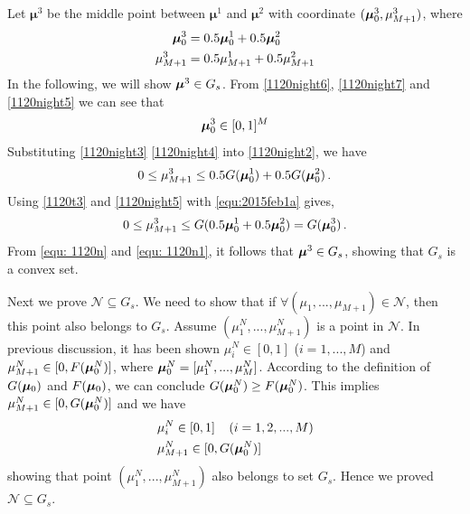 Let $\boldsymbol{\mu}^3$ be the middle point between $\boldsymbol{\mu}^1$ and $\boldsymbol{\mu}^2$ with coordinate $(\boldsymbol{\mu}_0^3, \mu_{M+1}^3)$, where  
\begin{subequations}
\label{1120t5}
\begin{align}
\label{1120night5}
\boldsymbol{\mu}_0^3 &= 0.5\boldsymbol{\mu}_0^1 + 0.5 \boldsymbol{\mu}_0^2\\
\label{1120night2}
\mu_{M+1}^3 &= 0.5 \mu_{M+1}^1 + 0.5 \mu_{M+1}^2
\end{align}
\end{subequations}
In the following, we will show $\boldsymbol{\mu}^3 \in G_s$.  
From \eqref{1120night6}, \eqref{1120night7} and \eqref{1120night5} we can see that
\begin{equation}
\label{equ: 1120n1}
\boldsymbol{\mu}_0^3 \in [0, 1]^M
\end{equation}
Substituting \eqref{1120night3} \eqref{1120night4} into \eqref{1120night2}, we have
\begin{equation}
  \label{equ:2015feb1a}
0 \leq \mu_{M+1}^3 \leq 0.5 G( \boldsymbol{\mu}_0^1) + 0.5G(\boldsymbol{\mu}_0^2)\,.
\end{equation} 
Using \eqref{1120t3} and \eqref{1120night5} with \eqref{equ:2015feb1a} gives,
\begin{equation}
\label{equ: 1120n}
0 \leq \mu_{M+1}^3 \leq G(0.5 \boldsymbol{\mu}_0^1 + 0.5\boldsymbol{\mu}_0^2) = G(\boldsymbol{\mu}_0^3)\,.
\end{equation}
From \eqref{equ: 1120n} and \eqref{equ: 1120n1}, it follows that  
 $\boldsymbol{\mu}^3 \in G_s$, showing that $G_s$  is a convex set.  

Next we prove $\mathcal{N} \subseteq G_s$. We need to show that if  $\forall (\mu_1, ..., \mu_{M+1}) \in \mathcal{N}$, then this point also belongs to $G_s$.
Assume $(\mu_1^N, ..., \mu_{M+1}^N)$ is a point in $\mathcal{N}$. 
In previous discussion, it has been shown $\mu_i^N \in [0, 1]$ ($i = 1, ..., M$) and $\mu_{M+1}^N \in [0, F(\boldsymbol{\mu}_0^N)]$, where $\boldsymbol{\mu}_0^N = [\mu_1^N, ..., \mu_M^N]$. 
According to the definition of $G(\boldsymbol{\mu}_0)$ and $F(\boldsymbol{\mu}_0)$, we can conclude $G(\boldsymbol{\mu}_0^N) \geq F(\boldsymbol{\mu}_0^N)$. 
This implies $\mu_{M+1}^N \in [0, G(\boldsymbol{\mu}_0^N)]$ and we have  
\begin{equation}
\begin{split}
&\mu_i^N \in [0, 1]\;\;\;\;(i=1, 2, ..., M)\\
&\mu_{M+1}^N \in [0, G(\boldsymbol{\mu}_0^N)]
\end{split}
\end{equation}
showing that point $(\mu_1^N, ..., \mu_{M+1}^N)$ also belongs to set $G_s$.
Hence we proved $\mathcal{N} \subseteq G_s$. 

